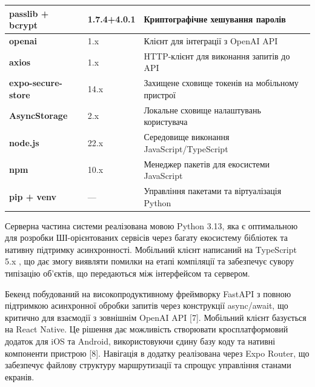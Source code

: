 \documentclass[
]{article}
\newcounter{none} %
\begin{document}
{\def\LTcaptype{none} %
\begin{longtable}[]{@{}
  >{\raggedright\arraybackslash}p{}
  >{\raggedright\arraybackslash}p{}
  >{\raggedright\arraybackslash}p{}@{}}
\toprule\noalign{}
\begin{minipage}[b]{\linewidth}\raggedright
\textbf{passlib + bcrypt}
\end{minipage} & \begin{minipage}[b]{\linewidth}\raggedright
1.7.4+4.0.1
\end{minipage} & \begin{minipage}[b]{\linewidth}\raggedright
Криптографічне хешування паролів
\end{minipage} \\
\midrule\noalign{}
\endhead
\bottomrule\noalign{}
\endlastfoot
\textbf{openai} & 1.x & Клієнт для інтеграції з OpenAI API \\
\textbf{axios} & 1.x & HTTP-клієнт для виконання запитів до API \\
\textbf{expo-secure-store} & 14.x & Захищене сховище токенів на
мобільному пристрої \\
\textbf{AsyncStorage} & 2.x & Локальне сховище налаштувань
користувача \\
\textbf{node.js} & 22.x & Середовище виконання JavaScript/TypeScript \\
\textbf{npm} & 10.x & Менеджер пакетів для екосистеми JavaScript \\
\textbf{pip + venv} & --- & Управління пакетами та віртуалізація
Python \\
\end{longtable}
}

Серверна частина системи реалізована мовою Python 3.13, яка є
оптимальною для розробки ШІ-орієнтованих сервісів через багату
екосистему бібліотек та нативну підтримку асинхронності. Мобільний
клієнт написаний на TypeScript 5.x , що дає змогу виявляти помилки на
етапі компіляції та забезпечує сувору типізацію об'єктів, що передаються
між інтерфейсом та сервером.

Бекенд побудований на високопродуктивному фреймворку FastAPI з повною
підтримкою асинхронної обробки запитів через конструкції async/await, що
критично для взаємодії з зовнішнім OpenAI API {[}7{]}. Мобільний клієнт
базується на React Native. Це рішення дає можливість створювати
кросплатформовий додаток для iOS та Android, використовуючи єдину базу
коду та нативні компоненти пристрою {[}8{]}. Навігація в додатку
реалізована через Expo Router, що забезпечує файлову структуру
маршрутизації та спрощує управління станами екранів.
\end{document}
